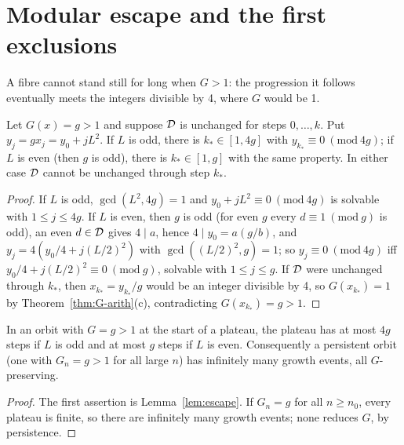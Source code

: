 \section{Modular escape and the first exclusions}

A fibre cannot stand still for long when \(G>1\): the progression it follows eventually meets the integers divisible by 4, where \(G\) would be 1.

\begin{lemma}\label{lem:escape}
Let \(G(x)=g>1\) and suppose \(\mathcal{D}\) is unchanged for steps \(0,\dots,k\). Put \(y_j=gx_j=y_0+jL^2\). If \(L\) is odd, there is \(k_*\in[1,4g]\) with \(y_{k_*}\equiv0\ (\mathrm{mod}\ 4g)\); if \(L\) is even (then \(g\) is odd), there is \(k_*\in[1,g]\) with the same property. In either case \(\mathcal{D}\) cannot be unchanged through step \(k_*\).
\end{lemma}
\begin{proof}
If \(L\) is odd, \(\gcd(L^2,4g)=1\) and \(y_0+jL^2\equiv0\ (\mathrm{mod}\ 4g)\) is solvable with \(1\le j\le4g\). If \(L\) is even, then \(g\) is odd (for even \(g\) every \(d\equiv1\ (\mathrm{mod}\ g)\) is odd), an even \(d\in\mathcal{D}\) gives \(4\mid a\), hence \(4\mid y_0=a(g/b)\), and \(y_j=4(y_0/4+j(L/2)^2)\) with \(\gcd((L/2)^2,g)=1\); so \(y_j\equiv0\ (\mathrm{mod}\ 4g)\) iff \(y_0/4+j(L/2)^2\equiv0\ (\mathrm{mod}\ g)\), solvable with \(1\le j\le g\). If \(\mathcal{D}\) were unchanged through \(k_*\), then \(x_{k_*}=y_{k_*}/g\) would be an integer divisible by 4, so \(G(x_{k_*})=1\) by Theorem~\ref{thm:G-arith}(c), contradicting \(G(x_{k_*})=g>1\).
\end{proof}

\begin{proposition}\label{th:plateau-escape}
In an orbit with \(G=g>1\) at the start of a plateau, the plateau has at most \(4g\) steps if \(L\) is odd and at most \(g\) steps if \(L\) is even. Consequently a persistent orbit (one with \(G_n=g>1\) for all large \(n\)) has infinitely many growth events, all \(G\)-preserving.
\end{proposition}
\begin{proof}
The first assertion is Lemma~\ref{lem:escape}. If \(G_n=g\) for all \(n\ge n_0\), every plateau is finite, so there are infinitely many growth events; none reduces \(G\), by persistence.
\end{proof}

